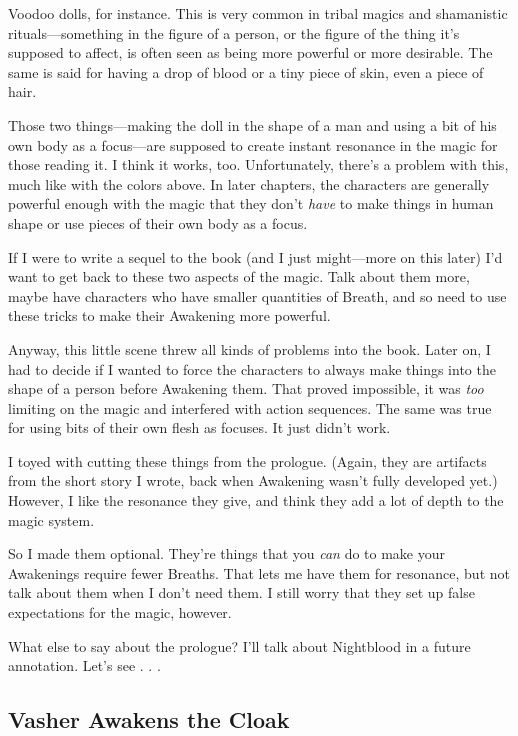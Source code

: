 Voodoo dolls, for instance. This is very common in tribal magics and shamanistic rituals—something in the figure of a person, or the figure of the thing it’s supposed to affect, is often seen as being more powerful or more desirable. The same is said for having a drop of blood or a tiny piece of skin, even a piece of hair.

Those two things—making the doll in the shape of a man and using a bit of his own body as a focus—are supposed to create instant resonance in the magic for those reading it. I think it works, too. Unfortunately, there’s a problem with this, much like with the colors above. In later chapters, the characters are generally powerful enough with the magic that they don’t \textit{have} to make things in human shape or use pieces of their own body as a focus.

If I were to write a sequel to the book (and I just might—more on this later) I’d want to get back to these two aspects of the magic. Talk about them more, maybe have characters who have smaller quantities of Breath, and so need to use these tricks to make their Awakening more powerful.

Anyway, this little scene threw all kinds of problems into the book. Later on, I had to decide if I wanted to force the characters to always make things into the shape of a person before Awakening them. That proved impossible, it was \textit{too }limiting on the magic and interfered with action sequences. The same was true for using bits of their own flesh as focuses. It just didn’t work.

I toyed with cutting these things from the prologue. (Again, they are artifacts from the short story I wrote, back when Awakening wasn’t fully developed yet.) However, I like the resonance they give, and think they add a lot of depth to the magic system.

So I made them optional. They’re things that you \textit{can} do to make your Awakenings require fewer Breaths. That lets me have them for resonance, but not talk about them when I don’t need them. I still worry that they set up false expectations for the magic, however.

\orn

What else to say about the prologue? I’ll talk about Nightblood in a future annotation. Let’s see . . .

\subsection*{Vasher Awakens the Cloak}

